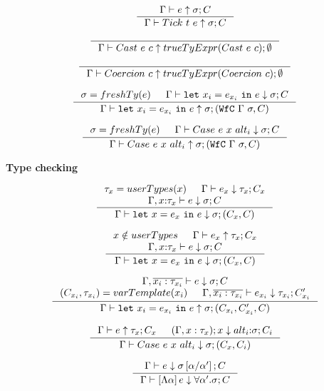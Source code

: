 $$
\inference{
	\hastype{\Gamma}{e}{\sigma}{C}
}{
	\hastype{\Gamma}{Tick\ t\ e}{\sigma}{C}
}
$$

$$
\inference{
}{
	\hastype{\Gamma}{Cast\ e\ c}{\truetyExpr{Cast\ e\ c}}{\emptyset}
}
$$

$$
\inference{
}{
	\hastype{\Gamma}{Coercion\ c}{\truetyExpr{Coercion\ c}}{\emptyset}
}
$$

$$
\inference{
	\sigma = \freshty{e} &&
	\checktype{\Gamma}{\elet{{x_i}}{e_{x_i}}{e}}{\sigma}{C}
}{
	\hastype{\Gamma}{\elet{{x_i}}{e_{x_i}}{e}}{\sigma}{(\wfc \Gamma \sigma, C)}
}
$$

$$
\inference{
	\sigma = \freshty{e} &&
	\checktype{\Gamma}{Case\ e\ x\ alt_i}{\sigma}{C}
}{
	\hastype{\Gamma}{Case\ e\ x\ alt_i}{\sigma}{(\wfc \Gamma \sigma, C)}
}
$$



\hfill\textbf{Type checking}\qquad\mbox{}





\newcommand\userType[1]{\ensuremath{userType(#1)}}

$$
\inference{
	\tau_x  = userTypes(x) &&
	\checktype{\Gamma}{e_x}{\tau_x}{C_x} \\&&
	\checktype{\Gamma, x\colon\tau_x}{e}{\sigma}{C}
}{
	\checktype{\Gamma}{\elet{x}{e_x}{e}}{\sigma}{(C_x,C)}
}
$$

$$
\inference{
	x \notin userTypes &&
	\hastype{\Gamma}{e_x}{\tau_x}{C_x} \\&&
	\checktype{\Gamma, x\colon\tau_x}{e}{\sigma}{C}
}{
	\checktype{\Gamma}{\elet{x}{e_x}{e}}{\sigma}{(C_x,C)}
}
$$

$$
\inference{
	\checktype{\Gamma, \overline{{x_i} : \tau_{x_i}}}{e}{\sigma}{C} &&\\
	(C_{x_i}, \tau_{x_i}) = \varTemplate{x_i} &&
	\checktype{\Gamma, \overline{{x_i} : \tau_{x_i}}}{e_{x_i}}{\tau_{x_i}}{C_{x_i}'}
}{
	\hastype{\Gamma}{\elet{{x_i}}{e_{x_i}}{e}}{\sigma}{(C_{x_i}, C_{x_i}', C)}
}
$$

$$
\inference{
	\hastype{\Gamma}{e}{\tau_x}{C_x} &&
	\hastypealt{(\Gamma, x:\tau_x)}{x}{alt_i}{\sigma}{C_i}
}{
	\checktype{\Gamma}{Case\ e\ x\ alt_i}{\sigma}{(C_x, C_i)}
}
$$

$$
\inference{
	\checktype{\Gamma}{e}{\sigma\sub{\alpha'}{\alpha}}{C}
}{
	\checktype{\Gamma}{\etabs{\alpha}{e}}{\tall{\alpha'}{\sigma}}{C}
}
$$

